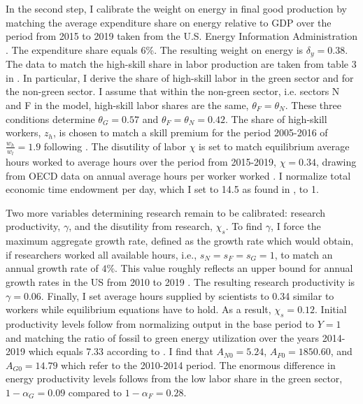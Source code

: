 In the second step, I calibrate the weight on energy in final good production by matching the average expenditure share on energy relative to GDP over the period from 2015 to 2019 taken from the U.S. Energy Information Administration \citep[][Table 1.7]{EIAEnergy}. The expenditure share equals 6\%. The resulting weight on energy is $\delta_y=0.38$.%
 The data to match the high-skill share in labor production are taken from table 3 in \cite{Consoli2016DoCapital}. In particular, I derive the share of high-skill labor in the green sector and for the non-green sector. I assume that within the non-green sector, i.e. sectors N and F in the model, high-skill labor shares are the same, $\theta_F=\theta_N$.  These three conditions determine $\theta_G=0.57$ and $\theta_F=\theta_N=0.42$. The share of high-skill workers, $z_h$, is chosen to match a skill premium for the period 2005-2016 of $\frac{w_h}{w_l}=1.9$ following \cite{Slavik2020WagePremium}. The disutility of labor $\chi$ is set to match equilibrium average hours worked to average hours over the period from 2015-2019, $\chi=0.34$, drawing from OECD data on annual average hours per worker worked \citep{OECDHoursworked}. I normalize total economic time endowment per day, which I set to 14.5 as found in \cite{Jones1993OptimalGrowth}, to 1. 

 Two more variables determining research remain to be calibrated: research productivity, $\gamma$, and the disutility from research, $\chi_s$.
 To find $\gamma$, I force the maximum aggregate growth rate, defined as the growth rate which would obtain, if researchers worked all available hours, i.e., $s_N=s_F=s_G=1$, to match an annual growth rate of $4\%$. This value roughly reflects an upper bound for annual growth rates in the US from 2010 to 2019 \citep[compare][]{OECDGDP}.
  The resulting research productivity is $\gamma = 0.06$.  Finally, I set average hours supplied by scientists to 0.34 similar to workers while equilibrium equations have to hold. As a result,  $\chi_s=0.12$. Initial productivity levels follow from normalizing output in the base period to $Y=1$ and matching the ratio of fossil to green energy utilization over the years 2014-2019 which equals 7.33 according to \cite[][Table 1.3]{EIAEnergy}. I find that $A_{N0}=5.24$, $A_{F0}=1850.60$, and $A_{G0}=14.79$ which refer to the 2010-2014 period. The enormous difference in energy productivity levels follows from the low labor share in the green sector, $1-\alpha_G=0.09$ compared to $1-\alpha_F= 0.28$. 
  
